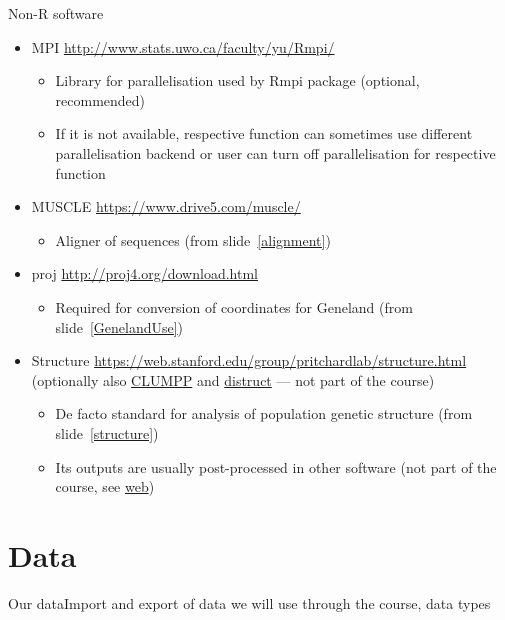 \documentclass[compress, ucs, xelatex, 11pt, xcolor=svgnames,
  hyperref={
    bookmarks=true,
    unicode=true,
    colorlinks=true,
    pdftitle={Molecular data in R},
    plainpages=false,
    pdfauthor={Vojtech Zeisek},
    pdfsubject={Course about phylogeny and evolution in R},
    pdfcreator={XeLaTeX},
    pdfkeywords={R, evolution, phylogeny, molecular data},
    linkcolor=Tomato,
    anchorcolor=SaddleBrown,
    citecolor=Goldenrod,
    filecolor=DarkMagenta,
    menucolor=Sienna,
    urlcolor=DarkTurquoise,
    pdftex},
  url={hyphens, lowtilde} %
  ]{beamer}
\begin{document}
\begin{frame}[allowframebreaks]{Non-R software}
\begin{itemize}
\begin{itemize}
    \end{itemize}
    \item MPI \url{http://www.stats.uwo.ca/faculty/yu/Rmpi/}
    \begin{itemize}
      \item Library for parallelisation used by Rmpi package (optional, recommended)
      \item If it is not available, respective function can sometimes use different parallelisation backend or user can turn off parallelisation for respective function
    \end{itemize}
    \item MUSCLE \url{https://www.drive5.com/muscle/}
    \begin{itemize}
      \item Aligner of sequences (from slide~\ref{alignment})
    \end{itemize}
    \item proj \url{http://proj4.org/download.html}
    \begin{itemize}
      \item Required for conversion of coordinates for Geneland (from slide~\ref{GenelandUse})
    \end{itemize}
    \item Structure \url{https://web.stanford.edu/group/pritchardlab/structure.html} (optionally also \href{https://web.stanford.edu/group/rosenberglab/clumpp.html}{CLUMPP} and \href{https://web.stanford.edu/group/rosenberglab/distruct.html}{distruct} --- not part of the course)
    \begin{itemize}
      \item De facto standard for analysis of population genetic structure (from slide~\ref{structure})
      \item Its outputs are usually post-processed in other software (not part of the course, see \href{https://trapa.cz/en/structure-r-linux}{web})
    \end{itemize}
  \end{itemize}
\end{frame}

\section{Data}

\begin{frame}{Our data}{Import and export of data we will use through the course, data types}
  \tableofcontents[currentsection, sectionstyle=show/hide, hideothersubsections]
\end{frame}
\end{document}
